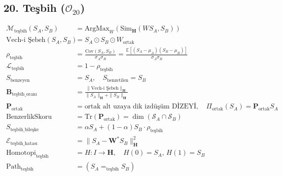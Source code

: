\documentclass[11pt, a4paper]{article}
\begin{document}
\subsection{20. Teşbih ($\mathcal{O}_{20}$)}
\begin{align}
\mathcal{M}_{\text{teşbih}}(S_A, S_B) &= \text{ArgMax}_{W} \left( \text{Sim}_{\mathbf{H}}(W S_A, S_B) \right) \\
\text{Vech-i Şebeh}(S_A, S_B) &= S_A \odot S_B \odot W_{\text{ortak}} \\
\rho_{\text{teşbih}} &= \frac{\text{Cov}(S_A, S_B)}{\sigma_A \sigma_B} = \frac{\mathbb{E}[(S_A - \mu_A)(S_B - \mu_B)]}{\sigma_A \sigma_B} \\
\mathcal{L}_{\text{teşbih}} &= 1 - \rho_{\text{teşbih}} \\
S_{\text{benzeyen}} &= S_A, \quad S_{\text{benzetilen}} = S_B \\
\mathbf{B}_{\text{teşbih\_oranı}} &= \frac{\| \text{Vech-i Şebeh} \|_{\mathbf{H}}}{\|S_A\|_{\mathbf{H}} + \|S_B\|_{\mathbf{H}}} \\
\mathbf{P}_{\text{ortak}} &= \text{ortak alt uzaya dik izdüşüm DİZEYİ}, \quad \Pi_{\text{ortak}}(S_A) = \mathbf{P}_{\text{ortak}} S_A \\
\text{BenzerlikSkoru} &= \text{Tr}(\mathbf{P}_{\text{ortak}}) = \dim(\mathcal{S}_A \cap \mathcal{S}_B) \\
S_{\text{teşbih\_bileşke}} &= \alpha S_A + (1-\alpha) S_B \cdot \rho_{\text{teşbih}} \\
\mathcal{E}_{\text{teşbih\_hatası}} &= \| S_A - \mathbf{W}^* S_B \|_{\mathbf{H}}^2 \\
\text{Homotopi}_{\text{teşbih}} &= H : I \to \mathbf{H}, \quad H(0)=S_A, \, H(1)=S_B \\
\text{Path}_{\text{teşbih}} &= (S_A =_{\text{teşbih}} S_B)
\end{align}
\end{document}
